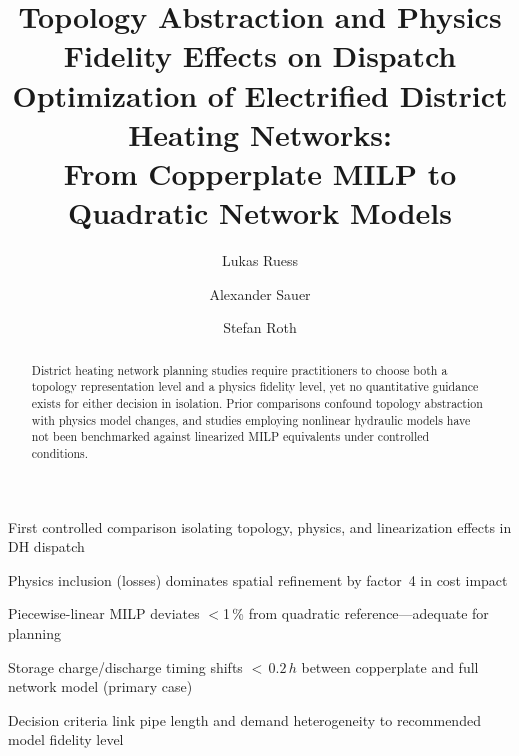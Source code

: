 \documentclass[review,3p]{elsarticle}
\begin{document}
\begin{frontmatter}

\title{Topology Abstraction and Physics Fidelity Effects on Dispatch
Optimization of Electrified District Heating Networks:\\
From Copperplate MILP to Quadratic Network Models}

\author[IPA]{Lukas Ruess}
\author[EEP]{Alexander Sauer}
\author[e-con]{Stefan Roth}


\address[IPA]{Fraunhofer-Institut für Produktionstechnik und Automatisierung, Stuttgart, Germany}
\address[EEP]{Institut für Energieeffizienz in der Produktion, Stuttgart, Germany}
\address[e-con]{e-con AG, Memmingen, Germany}

\begin{highlights}
  \item First controlled comparison isolating topology, physics, and
        linearization effects in DH dispatch
  \item Physics inclusion (losses) dominates spatial refinement by
        factor~4 in cost impact
  \item Piecewise-linear MILP deviates $<$1\,\% from
        quadratic reference---adequate for planning
  \item Storage charge/discharge timing shifts ${<}\,0.2\,h$ between
        copperplate and full network model (primary case)
  \item Decision criteria link pipe length and demand heterogeneity
        to recommended model fidelity level
\end{highlights}

\begin{abstract}
District heating network planning studies require practitioners to
choose both a topology representation level and a physics fidelity
level, yet no quantitative guidance exists for either decision in
isolation. Prior comparisons confound topology abstraction with
physics model changes, and studies employing nonlinear hydraulic
models have not been benchmarked against linearized MILP equivalents
under controlled conditions.


\end{abstract}
\end{frontmatter}
\end{document}

